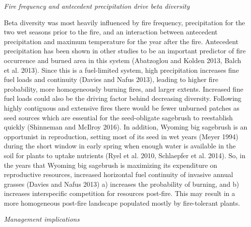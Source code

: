 \documentclass[12pt,]{article}
\begin{document}
\emph{Fire frequency and antecedent precipitation drive beta diversity}

Beta diversity was most heavily influenced by fire frequency,
precipitation for the two wet seasons prior to the fire, and an
interaction between antecedent precipitation and maximum temperature for
the year after the fire. Antecedent precipitation has been shown in
other studies to be an important predictor of fire occurrence and burned
area in this system (Abatzoglou and Kolden 2013, Balch et al. 2013).
Since this is a fuel-limited system, high precipitation increases fine
fuel loads and continuity (Davies and Nafus 2013), leading to higher
fire probability, more homogeneously burning fires, and larger extents.
Increased fine fuel loads could also be the driving factor behind
decreasing diversity. Following highly contiguous and extensive fires
there would be fewer unburned patches as seed sources which are
essential for the seed-obligate sagebrush to reestablish quickly
(Shinneman and McIlroy 2016). In addition, Wyoming big sagebrush is an
opportunist in reproduction, setting most of its seed in wet years
(Meyer 1994) during the short window in early spring when enough water
is available in the soil for plants to uptake nutrients (Ryel et al.
2010, Schlaepfer et al. 2014). So, in the years that Wyoming big
sagebrush is maximizing its expenditure on reproductive resources,
increased horizontal fuel continuity of invasive annual grasses (Davies
and Nafus 2013) a) increases the probability of burning, and b)
increases interspecific competition for resources post-fire. This may
result in a more homogeneous post-fire landscape populated mostly by
fire-tolerant plants.

\emph{Management implications}
\end{document}

